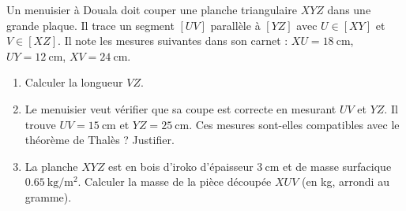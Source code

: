 \documentclass[11pt]{article}
\begin{document}
\begin{exercice}
Un menuisier à Douala doit couper une planche triangulaire $XYZ$ dans une grande plaque. Il trace un segment $[UV]$ parallèle à $[YZ]$ avec $U \in [XY]$ et $V \in [XZ]$. Il note les mesures suivantes dans son carnet : $XU = \SI{18}{\centi\meter}$, $UY = \SI{12}{\centi\meter}$, $XV = \SI{24}{\centi\meter}$.
\begin{enumerate}
    \item Calculer la longueur $VZ$.
    \item Le menuisier veut vérifier que sa coupe est correcte en mesurant $UV$ et $YZ$. Il trouve $UV = \SI{15}{\centi\meter}$ et $YZ = \SI{25}{\centi\meter}$. Ces mesures sont-elles compatibles avec le théorème de Thalès ? Justifier.
    \item La planche $XYZ$ est en bois d'iroko d'épaisseur $\SI{3}{\centi\meter}$ et de masse surfacique $\SI{0,65}{\kilogram\per\meter\squared}$. Calculer la masse de la pièce découpée $XUV$ (en kg, arrondi au gramme).
\end{enumerate}
\end{exercice}
\end{document}
